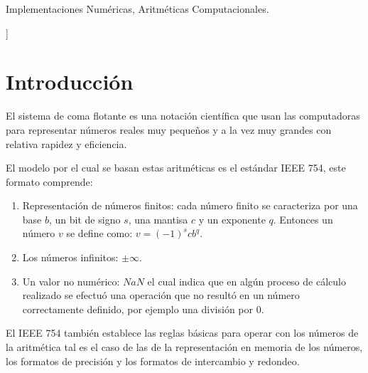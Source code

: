 \documentclass[a4paper,10pt,twocolumn]{article}
\begin{document}
	\begin{keywords}
		Implementaciones Numéricas,
		Aritméticas Computacionales.
	\end{keywords}
	
	\vspace{0.8cm}
]



\section{Introducción}\label{sec:intro}
El sistema de coma flotante es una notación científica que usan las computadoras para representar números reales muy pequeños y a la vez muy grandes con relativa rapidez y eficiencia.

El modelo por el cual se basan estas aritméticas es el estándar IEEE 754, este formato comprende:
\begin{enumerate}

	\item Representación de números finitos: cada número finito se caracteriza por una base $b$, un bit de signo $s$, una mantisa $c$ y un exponente $q$. Entonces un número $v$ se define como: $v=(-1)^s c b^q$.
	      
	\item Los números infinitos: $\pm\infty$.
	      
	\item Un valor no numérico: $NaN$ el cual indica que en algún proceso de cálculo realizado se efectuó una operación que no resultó en un número correctamente definido, por ejemplo una división por 0.
\end{enumerate}

El IEEE 754 también establece las reglas básicas para operar con los números de la aritmética tal es el caso de las de la representación en memoria de los números, los formatos de precisión y los formatos de intercambio y redondeo.
\end{document}
